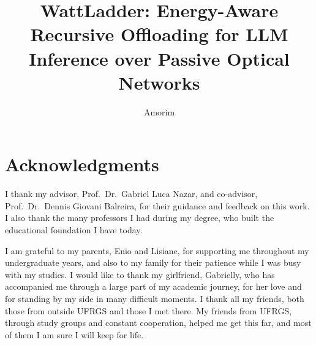 \documentclass[cic,dipl,english]{infufrgs}
\title{WattLadder: Energy-Aware Recursive Offloading for LLM Inference over
  Passive Optical Networks}
\author{Amorim}{Diego Hommerding}
\begin{document}

\maketitle

\chapter*{Acknowledgments}
I thank my advisor, Prof.~Dr.~Gabriel Luca Nazar, and co-advisor, Prof.~Dr.~\mbox{Dennis} Giovani
Balreira, for their guidance and feedback on this work. I also thank the many professors I had
during my degree, who built the educational foundation I have today.

I am grateful to my parents, Enio and Lisiane, for supporting me throughout my undergraduate
years, and also to my family for their patience while I was busy with my studies. I would like
to thank my girlfriend, Gabrielly, who has accompanied me through a large part of my academic
journey, for her love and for standing by my side in many difficult moments. I thank
all my friends, both those from outside UFRGS and those I met there. My friends from UFRGS,
through study groups and constant cooperation, helped me get this far, and most of them I am
sure I will keep for life.
\end{document}
